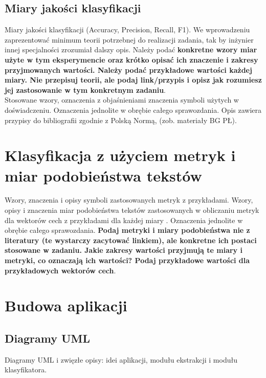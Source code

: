\documentclass{classrep}
\begin{document}
\subsection{Miary jakości klasyfikacji} 
Miary jakości klasyfikacji (Accuracy, Precision,
Recall, F1). We wprowadzeniu zaprezentować minimum teorii potrzebnej do realizacji
zadania, tak by inżynier innej specjalności zrozumiał dalszy opis. Należy podać {\bf konkretne wzory miar użyte w tym eksperymencie oraz krótko
opisać ich znaczenie i zakresy przyjmowanych wartości. Należy podać przykładowe
wartości każdej miary. Nie przepisuj
teorii, ale podaj link/przypis i opisz jak rozumiesz jej zastosowanie w tym konkretnym
zadaniu}. \\
\indent Stosowane wzory, oznaczenia z objaśnieniami znaczenia symboli użytych w
doświadczeniu. Oznaczenia jednolite w obrębie całego sprawozdania.  Opis zawiera przypisy do bibliografii zgodnie z
Polską Normą, (zob. materiały BG PŁ).\\


\section{Klasyfikacja z użyciem metryk i miar podobieństwa tekstów}
Wzory, znaczenia i opisy symboli zastosowanych metryk z
przykładami. Wzory, opisy i znaczenia miar
podobieństwa tekstów zastosowanych w obliczaniu metryk dla wektorów cech z
przykładami dla każdej miary \cite{niewiadomski08}.  Oznaczenia jednolite w obrębie całego sprawozdania.  {\bf Podaj metryki i miary
podobieństwa nie z literatury (te wystarczy zacytować linkiem), ale konkretne ich
postaci stosowane w zadaniu. Jakie zakresy wartości przyjmują te miary i
metryki, co oznaczają ich wartości? Podaj przykładowe wartości dla przykładowych wektorów cech}. \\ 

\section{Budowa aplikacji}
\subsection{Diagramy UML}
Diagramy UML i zwięzłe opisy: idei aplikacji, modułu ekstrakcji i modułu
klasyfikatora.\\
\end{document}
